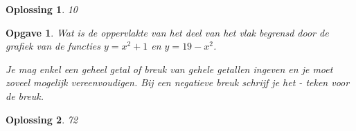 \documentclass{article}
\newtheorem{opgave}{Opgave}
\newtheorem*{oplossing}{Oplossing}
\begin{document}
\begin{oplossing}
10
\end{oplossing}

\begin{opgave}
Wat is de oppervlakte van het deel van het vlak begrensd door de grafiek van de functies $y=x^2+1$ en $y=19-x^2$.

\noindent Je mag enkel een geheel getal of breuk van gehele getallen ingeven en je moet zoveel mogelijk vereenvoudigen. Bij een negatieve breuk schrijf je het - teken voor de breuk.
\end{opgave}

\begin{oplossing}
72
\end{oplossing}
\end{document}
